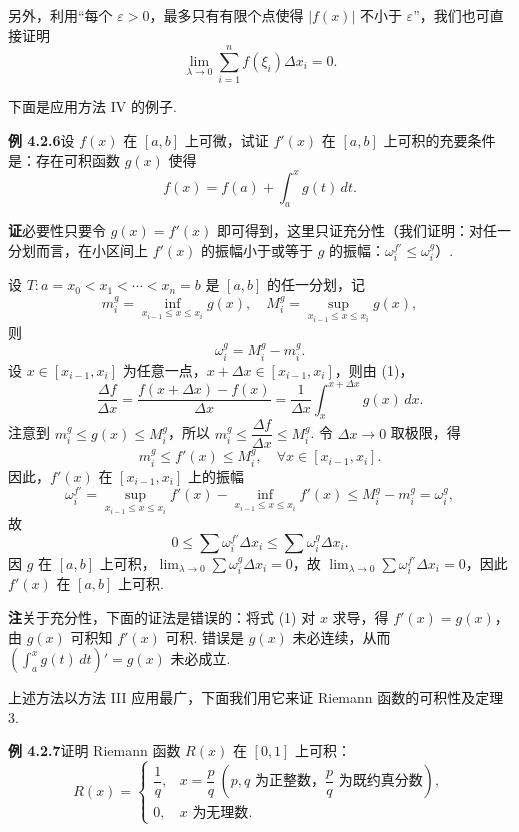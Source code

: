 \documentclass[UTF8,12pt,a4paper,fontset=fandol]{ctexart}
\begin{document}
另外，利用“每个 $\varepsilon>0$，最多只有有限个点使得 $|f(x)|$ 不小于 $\varepsilon$”，我们也可直接证明
\[
\lim_{\lambda\to0}\sum_{i=1}^n f(\xi_i)\Delta x_i=0.
\]

下面是应用方法 IV 的例子.

\noindent\textbf{例 4.2.6}\quad 设 $f(x)$ 在 $[a,b]$ 上可微，试证 $f'(x)$ 在 $[a,b]$ 上可积的充要条件是：存在可积函数 $g(x)$ 使得
\[
f(x)=f(a)+\int_a^x g(t)\,dt.
\tag{1}
\]

\noindent\textbf{证}\quad 必要性只要令 $g(x)=f'(x)$ 即可得到，这里只证充分性（我们证明：对任一分划而言，在小区间上 $f'(x)$ 的振幅小于或等于 $g$ 的振幅：$\omega_i^{f'}\le\omega_i^g$）.

设 $T:a=x_0<x_1<\cdots<x_n=b$ 是 $[a,b]$ 的任一分划，记
\[
m_i^g=\inf_{x_{i-1}\le x\le x_i}g(x),\quad
M_i^g=\sup_{x_{i-1}\le x\le x_i}g(x),
\]
则
\[
\omega_i^g=M_i^g-m_i^g.
\]
设 $x\in[x_{i-1},x_i]$ 为任意一点，$x+\Delta x\in[x_{i-1},x_i]$，则由 (1)，
\[
\frac{\Delta f}{\Delta x}
=\frac{f(x+\Delta x)-f(x)}{\Delta x}
=\frac1{\Delta x}\int_x^{x+\Delta x}g(x)\,dx.
\]
注意到 $m_i^g\le g(x)\le M_i^g$，所以 $m_i^g\le\dfrac{\Delta f}{\Delta x}\le M_i^g$. 令 $\Delta x\to0$ 取极限，得
\[
m_i^g\le f'(x)\le M_i^g,\quad \forall x\in[x_{i-1},x_i].
\]
因此，$f'(x)$ 在 $[x_{i-1},x_i]$ 上的振幅
\[
\omega_i^{f'}=
\sup_{x_{i-1}\le x\le x_i}f'(x)
-\inf_{x_{i-1}\le x\le x_i}f'(x)
\le M_i^g-m_i^g=\omega_i^g,
\]
故
\[
0\le\sum\omega_i^{f'}\Delta x_i\le\sum\omega_i^g\Delta x_i.
\]
因 $g$ 在 $[a,b]$ 上可积，$\lim_{\lambda\to0}\sum\omega_i^g\Delta x_i=0$，故 $\lim_{\lambda\to0}\sum\omega_i^{f'}\Delta x_i=0$，因此 $f'(x)$ 在 $[a,b]$ 上可积.

\noindent\textbf{注}\quad 关于充分性，下面的证法是错误的：将式 (1) 对 $x$ 求导，得 $f'(x)=g(x)$，由 $g(x)$ 可积知 $f'(x)$ 可积. 错误是 $g(x)$ 未必连续，从而 $\left(\int_a^x g(t)\,dt\right)'=g(x)$ 未必成立.

上述方法以方法 III 应用最广，下面我们用它来证 Riemann 函数的可积性及定理 3.

\noindent\textbf{例 4.2.7}\quad 证明 Riemann 函数 $R(x)$ 在 $[0,1]$ 上可积：
\[
R(x)=
\begin{cases}
\dfrac1q, & x=\dfrac pq\ (p,q\text{ 为正整数，}\dfrac pq\text{ 为既约真分数}),\\
0, & x\text{ 为无理数}.
\end{cases}
\]
\end{document}
